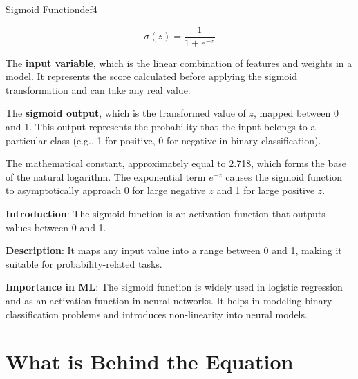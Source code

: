 \documentclass[
  12 pt,
  a4paper,
]{book}
\numberwithin{equation}{section}
\theoremstyle{plain}      %
\theoremstyle{definition} %
\theoremstyle{remark}     %
\theoremstyle{note}         %
\begin{document}
\vspace*{\fill}
\begin{a_def_eq}{Sigmoid Function}{def4} 

$$
\sigma(z) = \frac{1}{1 + e^{-z}}
$$

\begin{description}[align=left, labelwidth=2cm, labelsep=0em, leftmargin=2cm]
    \item[$z$] The \textbf{input variable}, which is the linear combination of features and weights in a model. It represents the score calculated before applying the sigmoid transformation and can take any real value.
    \vspace{0.5\baselineskip}
    \item[$\sigma(z)$] The \textbf{sigmoid output}, which is the transformed value of \( z \), mapped between 0 and 1. This output represents the probability that the input belongs to a particular class (e.g., 1 for positive, 0 for negative in binary classification).
    \vspace{0.5\baselineskip}
    \item[$e$] The mathematical constant, approximately equal to 2.718, which forms the base of the natural logarithm. The exponential term \( e^{-z} \) causes the sigmoid function to asymptotically approach 0 for large negative \( z \) and 1 for large positive \( z \).
    \vspace{0.5\baselineskip}
\end{description}

\end{a_def_eq}

\hfill\break

\textbf{Introduction}: The sigmoid function is an activation function
that outputs values between 0 and 1.

\textbf{Description}: It maps any input value into a range between 0 and
1, making it suitable for probability-related tasks.

\textbf{Importance in ML}: The sigmoid function is widely used in
logistic regression and as an activation function in neural networks. It
helps in modeling binary classification problems and introduces
non-linearity into neural models.

\vspace*{\fill}

\newpage

\hypertarget{what-is-behind-the-equation-3}{%
\section{What is Behind the
Equation}\label{what-is-behind-the-equation-3}}
\end{document}
